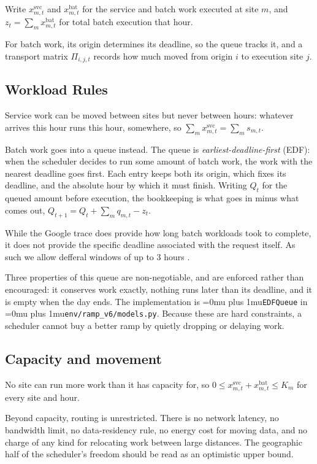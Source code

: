 \documentclass[12pt]{article}
\newcommand{\codepath}[1]{{\Urlmuskip=0mu plus 1mu\relax\nolinkurl{#1}}}
\begin{document}
Write \(x^{\mathrm{svc}}_{m,t}\) and \(x^{\mathrm{bat}}_{m,t}\) for the service and batch work executed at site \(m\), and \(z_t=\sum_m x^{\mathrm{bat}}_{m,t}\) for total batch execution that hour.

For batch work, its origin determines its deadline, so the queue tracks it, and a transport matrix \(\Pi_{i,j,t}\) records how much moved from origin \(i\) to execution site \(j\).

\subsection{Workload Rules}
\label{subsec:problem-workload-rules}

Service work can be moved between sites but never between hours: whatever arrives this hour runs this hour, somewhere, so \(\sum_m x^{\mathrm{svc}}_{m,t}=\sum_m s_{m,t}\).

Batch work goes into a queue instead. The queue is \emph{earliest-deadline-first} (EDF): when the scheduler decides to run some amount of batch work, the work with the nearest deadline goes first. Each entry keeps both its origin, which fixes its deadline, and the absolute hour by which it must finish. Writing \(Q_t\) for the queued amount before execution, the bookkeeping is what goes in minus what comes out, \(Q_{t+1}=Q_t+\sum_m q_{m,t}-z_t\).

While the Google trace does provide how long batch workloads took to complete, it does not provide the specific deadline associated with the request itself. As such we allow defferal windows of up to 3 hours . 

Three properties of this queue are non-negotiable, and are enforced rather than encouraged: it conserves work exactly, nothing runs later than its deadline, and it is empty when the day ends. The implementation is \codepath{EDFQueue} in \codepath{env/ramp_v6/models.py}. Because these are hard constraints, a scheduler cannot buy a better ramp by quietly dropping or delaying work.

\subsection{Capacity and movement}
\label{subsec:problem-feasibility}

No site can run more work than it has capacity for, so \(0\leq x^{\mathrm{svc}}_{m,t}+x^{\mathrm{bat}}_{m,t}\leq K_m\) for every site and hour.

Beyond capacity, routing is unrestricted. There is no network latency, no bandwidth limit, no data-residency rule, no energy cost for moving data, and no charge of any kind for relocating work between large distances. The geographic half of the scheduler's freedom should be read as an optimistic upper bound.
\end{document}
